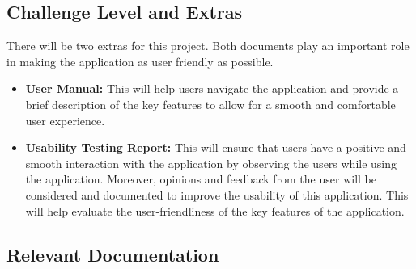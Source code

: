 \documentclass[12pt, titlepage]{article}
\begin{document}
\subsection{Challenge Level and Extras}

There will be two extras for this project. Both documents play an important role in making the application as user friendly as possible. 
\begin{itemize}
    \item \textbf{User Manual:} This will help users navigate the application and provide a brief description of the key features to allow for a smooth and comfortable user experience.
    \item \textbf{Usability Testing Report:} This will ensure that users have a positive and smooth interaction with the application by observing the users while using the application. Moreover, opinions and feedback from the user will be considered and documented to improve the usability of this application. This will help evaluate the user-friendliness of the key features of the application. 
\end{itemize}


\subsection{Relevant Documentation}
\end{document}
